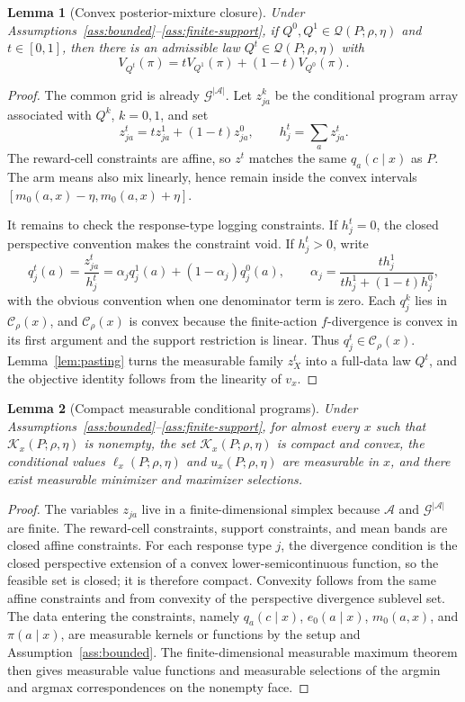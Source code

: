 \documentclass[11pt]{article}
\theoremstyle{definition}
\theoremstyle{plain}
\newtheorem{lemma}{Lemma}
\theoremstyle{remark}
\begin{document}
\begin{lemma}[Convex posterior-mixture closure]\label{lem:mixture-closure}
Under Assumptions~\ref{ass:bounded}--\ref{ass:finite-support}, if
$Q^0,Q^1\in\mathcal Q(P;\rho,\eta)$ and $t\in[0,1]$, then there is an
admissible law $Q^t\in\mathcal Q(P;\rho,\eta)$ with
\[
  V_{Q^t}(\pi)=tV_{Q^1}(\pi)+(1-t)V_{Q^0}(\pi).
\]
\end{lemma}

\begin{proof}
The common grid is already $\mathcal G^{|\mathcal A|}$.  Let $z^k_{ja}$ be the
conditional program array associated with $Q^k$, $k=0,1$, and set
\[
  z^t_{ja}=tz^1_{ja}+(1-t)z^0_{ja},\qquad
  h_j^t=\sum_a z^t_{ja}.
\]
The reward-cell constraints are affine, so $z^t$ matches the same
$q_a(c\mid x)$ as $P$.  The arm means also mix linearly, hence remain inside
the convex intervals
$[m_0(a,x)-\eta,m_0(a,x)+\eta]$.

It remains to check the response-type logging constraints.  If $h_j^t=0$, the
closed perspective convention makes the constraint void.  If $h_j^t>0$, write
\[
  q_j^t(a)=\frac{z^t_{ja}}{h_j^t}
  =\alpha_j q_j^1(a)+(1-\alpha_j)q_j^0(a),
  \qquad
  \alpha_j=\frac{t h_j^1}{t h_j^1+(1-t)h_j^0},
\]
with the obvious convention when one denominator term is zero.  Each
$q_j^k$ lies in $\mathcal C_\rho(x)$, and $\mathcal C_\rho(x)$ is convex because
the finite-action $f$-divergence is convex in its first argument and the support
restriction is linear.  Thus $q_j^t\in\mathcal C_\rho(x)$.  Lemma~\ref{lem:pasting}
turns the measurable family $z^t_X$ into a full-data law $Q^t$, and the
objective identity follows from the linearity of $v_x$.
\end{proof}

\begin{lemma}[Compact measurable conditional programs]\label{lem:measurable-program}
Under Assumptions~\ref{ass:bounded}--\ref{ass:finite-support}, for almost every
$x$ such that $\mathcal K_x(P;\rho,\eta)$ is nonempty, the set
$\mathcal K_x(P;\rho,\eta)$ is compact and convex, the conditional values
$\ell_x(P;\rho,\eta)$ and $u_x(P;\rho,\eta)$ are measurable in $x$, and there
exist measurable minimizer and maximizer selections.
\end{lemma}

\begin{proof}
The variables $z_{ja}$ live in a finite-dimensional simplex because
$\mathcal A$ and $\mathcal G^{|\mathcal A|}$ are finite.  The reward-cell
constraints, support constraints, and mean bands are closed affine constraints.
For each response type $j$, the divergence condition is the closed perspective
extension of a convex lower-semicontinuous function, so the feasible set is
closed; it is therefore compact.  Convexity follows from the same affine
constraints and from convexity of the perspective divergence sublevel set.  The
data entering the constraints, namely $q_a(c\mid x)$, $e_0(a\mid x)$,
$m_0(a,x)$, and $\pi(a\mid x)$, are measurable kernels or functions by the setup
and Assumption~\ref{ass:bounded}.  The finite-dimensional measurable maximum
theorem then gives measurable value functions and measurable selections of the
argmin and argmax correspondences on the nonempty face.
\end{proof}
\end{document}
